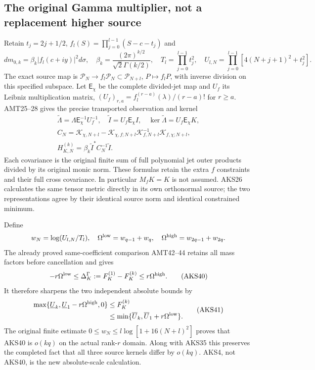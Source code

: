 \subsection{The original Gamma multiplier, not a replacement higher source}
Retain $t_j=2j+1/2$, $f_l(S)=\prod_{j=0}^{l-1}(S-c-t_j)$ and
\[
 dm_{0,k}=\beta_k|f_l(c+iy)|^2d\sigma,\quad
 \beta_k=\frac{(2\pi)^{k/2}}{\sqrt2\Gamma(k/2)},\quad
 T_l=\prod_{j=0}^{l-1}t_j^2,\quad
 U_{l,N}=\prod_{j=0}^{l-1}[4(N+j+1)^2+t_j^2].
 \tag{AKS38}
\]
The exact source map is $\mathcal P_N\to f_l\mathcal P_N\subset
\mathcal P_{N+l}$, $P\mapsto f_lP$, with inverse division on this
specified subspace. Let $\mathsf E_\chi$ be the complete divided-jet
map and $U_f$ its Leibniz multiplication matrix,
$(U_f)_{r,a}=f_l^{(r-a)}(\lambda)/(r-a)!$ for $r\ge a$.
AMT25--28 gives the precise transported observation and kernel
\[
\begin{gathered}
 \widetilde\Lambda=\Lambda\mathsf E_\chi^{-1}U_f^{-1},\quad
 \widetilde I=U_f\mathsf E_\chi I,\quad
 \ker\widetilde\Lambda=U_f\mathsf E_\chi K,\\
 C_N=\mathscr K_{\chi,N+l}
   -\mathscr K_{\chi,f;N+l}\mathscr K_{f,N+l}^{-1}
                               \mathscr K_{f,\chi;N+l},\\
 H_{K,N}^{(k)}=\beta_k\widetilde I^*C_N^{-1}\widetilde I.
\end{gathered}\tag{AKS39}
\]
Each covariance is the original finite sum of full polynomial jet outer
products divided by its original monic norm. These formulas retain the
extra $f$ constraints and their full cross covariance. In particular
$M_fK=K$ is not assumed. AKS26 calculates the same tensor metric directly
in its own orthonormal source; the two representations agree by their
identical source norm and identical constrained minimum.

Define
\[
 w_N=\log(U_{l,N}/T_l),\quad
 \Omega^{\rm low}=w_{q-1}+w_q,\quad
 \Omega^{\rm high}=w_{2q-1}+w_{2q}.
\]
The already proved same-coefficient comparison AMT42--44 retains all
mass factors before cancellation and gives
\[
 -r\Omega^{\rm low}\le\Delta_K^\Gamma:=F_K^{(1)}-F_K^{(k)}
                         \le r\Omega^{\rm high}.
 \tag{AKS40}
\]
It therefore sharpens the two independent absolute bounds by
\[
\begin{split}
 \max\{\underline U_k,\underline U_1-r\Omega^{\rm high},0\}
       &\le F_K^{(k)}\\
       &\le\min\{\overline U_k,\overline U_1+r\Omega^{\rm low}\}.
\end{split}\tag{AKS41}
\]
The original finite estimate
$0\le w_N\le l\log[1+16(N+l)^2]$ proves that AKS40 is $o(kq)$ on the
actual rank-$r$ domain. Along with AKS35 this preserves the completed
fact that all three source kernels differ by $o(kq)$. AKS4, not AKS40,
is the new absolute-scale calculation.

